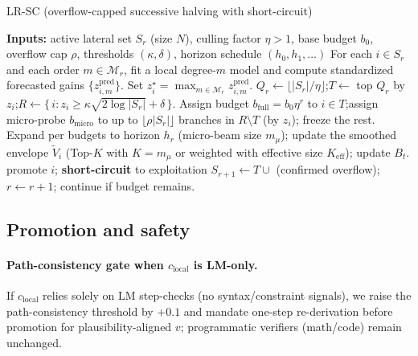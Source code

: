 \documentclass{article}
\begin{document}
\begin{algorithm}[t]
\caption{LR-SC (overflow-capped successive halving with short-circuit)}
\label{alg:lrscr}
\begin{algorithmic}[1]
\State \textbf{Inputs:} active lateral set $S_r$ (size $N$), culling factor $\eta>1$, base budget $b_0$, overflow cap $\rho$, thresholds $(\kappa,\delta)$, horizon schedule $(h_0,h_1,\dots)$
\State For each $i\in S_r$ and each order $m\in\mathcal{M}_r$, fit a local degree-$m$ model and compute standardized forecasted gains $\{z^{\mathrm{pred}}_{i,m}\}$. Set $z_i^{\star}=\max_{m\in\mathcal{M}_r} z^{\mathrm{pred}}_{i,m}$.
\State $Q_r \leftarrow \lfloor |S_r|/\eta \rfloor$;\quad $T \leftarrow$ top $Q_r$ by $z_i$;\quad $R \leftarrow \{\,i : z_i \ge \kappa \sqrt{2\log |S_r|} + \delta\,\}$.
\State Assign budget $b_{\text{full}} = b_0 \eta^r$ to $i\in T$;\quad assign micro-probe $b_{\text{micro}}$ to up to $\lfloor \rho |S_r|\rfloor$ branches in $R\setminus T$ (by $z_i$); freeze the rest.
\State Expand per budgets to horizon $h_r$ (micro-beam size $m_{\mu}$); update the smoothed envelope $\tilde V_i$ (Top-$K$ with $K{=}m_{\mu}$ or weighted with effective size $K_{\mathrm{eff}}$); update $B_t$.
  \State promote $i$; \textbf{short-circuit} to exploitation
\EndIf
\State $S_{r+1} \leftarrow T \cup$ (confirmed overflow); $r\leftarrow r+1$; continue if budget remains.
\end{algorithmic}
\end{algorithm}


\vspace{-0.5em}

\subsection{Promotion and safety}
\label{sec:promotion}
\paragraph{Path-consistency gate when $c_{\text{local}}$ is LM-only.}
If $c_{\text{local}}$ relies solely on LM step-checks (no syntax/constraint signals), we raise the path-consistency threshold by $+0.1$
and mandate one-step re-derivation before promotion for plausibility-aligned $v$; programmatic verifiers (math/code) remain unchanged.
\end{document}
